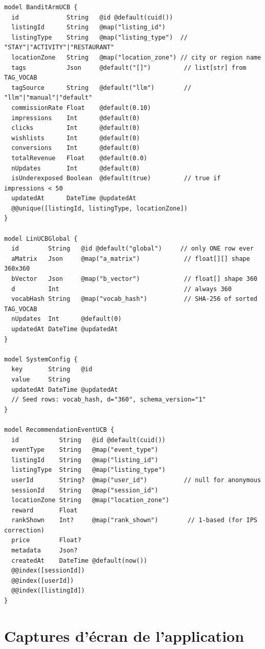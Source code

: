 \begin{lstlisting}[language={},caption={Modèles Prisma du moteur LinUCB (prisma/schema.prisma)}]
model BanditArmUCB {
  id             String   @id @default(cuid())
  listingId      String   @map("listing_id")
  listingType    String   @map("listing_type")  // "STAY"|"ACTIVITY"|"RESTAURANT"
  locationZone   String   @map("location_zone") // city or region name
  tags           Json     @default("[]")         // list[str] from TAG_VOCAB
  tagSource      String   @default("llm")        // "llm"|"manual"|"default"
  commissionRate Float    @default(0.10)
  impressions    Int      @default(0)
  clicks         Int      @default(0)
  wishlists      Int      @default(0)
  conversions    Int      @default(0)
  totalRevenue   Float    @default(0.0)
  nUpdates       Int      @default(0)
  isUnderexposed Boolean  @default(true)         // true if impressions < 50
  updatedAt      DateTime @updatedAt
  @@unique([listingId, listingType, locationZone])
}

model LinUCBGlobal {
  id        String   @id @default("global")     // only ONE row ever
  aMatrix   Json     @map("a_matrix")            // float[][] shape 360x360
  bVector   Json     @map("b_vector")            // float[] shape 360
  d         Int                                  // always 360
  vocabHash String   @map("vocab_hash")          // SHA-256 of sorted TAG_VOCAB
  nUpdates  Int      @default(0)
  updatedAt DateTime @updatedAt
}

model SystemConfig {
  key       String   @id
  value     String
  updatedAt DateTime @updatedAt
  // Seed rows: vocab_hash, d="360", schema_version="1"
}

model RecommendationEventUCB {
  id           String   @id @default(cuid())
  eventType    String   @map("event_type")
  listingId    String   @map("listing_id")
  listingType  String   @map("listing_type")
  userId       String?  @map("user_id")          // null for anonymous
  sessionId    String   @map("session_id")
  locationZone String   @map("location_zone")
  reward       Float
  rankShown    Int?     @map("rank_shown")        // 1-based (for IPS correction)
  price        Float?
  metadata     Json?
  createdAt    DateTime @default(now())
  @@index([sessionId])
  @@index([userId])
  @@index([listingId])
}
\end{lstlisting}


\section{Captures d'écran de l'application}
\label{ann:screenshots}

